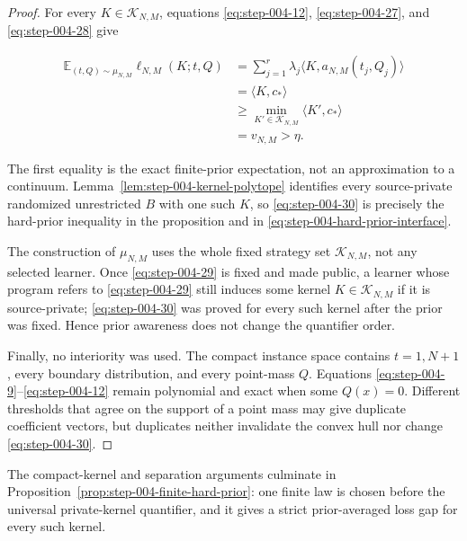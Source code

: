 \begin{proof}
For every \(K\in\mathcal K_{N,M}\), equations \eqref{eq:step-004-12}, \eqref{eq:step-004-27}, and \eqref{eq:step-004-28} give

\[
\begin{aligned}
\mathbb E_{(t,Q)\sim\mu_{N,M}}\ell_{N,M}(K;t,Q)
&=\sum_{j=1}^r\lambda_j
  \langle K,a_{N,M}(t_j,Q_j)\rangle\\
&=\langle K,c_*\rangle\\
&\ge\min_{K'\in\mathcal K_{N,M}}\langle K',c_*\rangle\\
&=v_{N,M}>\eta.
\end{aligned}
\tag{S4.30}\label{eq:step-004-30}
\]

The first equality is the exact finite-prior expectation, not an
approximation to a continuum. Lemma~\ref{lem:step-004-kernel-polytope}
identifies every source-private randomized unrestricted \(B\) with one such
\(K\), so \eqref{eq:step-004-30} is precisely the hard-prior inequality in
the proposition and in \eqref{eq:step-004-hard-prior-interface}.

The construction of \(\mu_{N,M}\) uses the whole fixed strategy set
\(\mathcal K_{N,M}\), not any selected learner. Once \eqref{eq:step-004-29} is fixed and made
public, a learner whose program refers to \eqref{eq:step-004-29} still induces some kernel
\(K\in\mathcal K_{N,M}\) if it is source-private; \eqref{eq:step-004-30} was proved for every
such kernel after the prior was fixed. Hence prior awareness does not change
the quantifier order.

Finally, no interiority was used. The compact instance space contains
\(t=1,N+1\), every boundary distribution, and every point-mass \(Q\).
Equations \eqref{eq:step-004-9}--\eqref{eq:step-004-12} remain polynomial and exact when some \(Q(x)=0\).
Different thresholds that agree on the support of a point mass may give
duplicate coefficient vectors, but duplicates neither invalidate the convex
hull nor change \eqref{eq:step-004-30}. \end{proof}
The compact-kernel and separation arguments culminate in
Proposition~\ref{prop:step-004-finite-hard-prior}: one finite law is chosen
before the universal private-kernel quantifier, and it gives a strict
prior-averaged loss gap for every such kernel.

